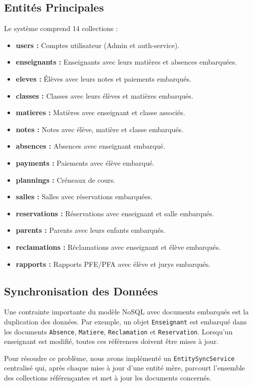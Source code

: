 \documentclass[12pt,a4paper,twoside]{report}
\begin{document}
\subsection{Entités Principales}
Le système comprend 14 collections :
\begin{itemize}[leftmargin=*]
  \item \textbf{users :} Comptes utilisateur (Admin et auth-service).
  \item \textbf{enseignants :} Enseignants avec leurs matières et absences embarquées.
  \item \textbf{eleves :} Élèves avec leurs notes et paiements embarqués.
  \item \textbf{classes :} Classes avec leurs élèves et matières embarqués.
  \item \textbf{matieres :} Matières avec enseignant et classe associés.
  \item \textbf{notes :} Notes avec élève, matière et classe embarqués.
  \item \textbf{absences :} Absences avec enseignant embarqué.
  \item \textbf{payments :} Paiements avec élève embarqué.
  \item \textbf{plannings :} Créneaux de cours.
  \item \textbf{salles :} Salles avec réservations embarquées.
  \item \textbf{reservations :} Réservations avec enseignant et salle embarqués.
  \item \textbf{parents :} Parents avec leurs enfants embarqués.
  \item \textbf{reclamations :} Réclamations avec enseignant et élève embarqués.
  \item \textbf{rapports :} Rapports PFE/PFA avec élève et jurys embarqués.
\end{itemize}

\subsection{Synchronisation des Données}
Une contrainte importante du modèle NoSQL avec documents embarqués est la duplication des données. Par exemple, un objet \texttt{Enseignant} est embarqué dans les documents \texttt{Absence}, \texttt{Matiere}, \texttt{Reclamation} et \texttt{Reservation}. Lorsqu'un enseignant est modifié, toutes ces références doivent être mises à jour.

Pour résoudre ce problème, nous avons implémenté un \texttt{EntitySyncService} centralisé qui, après chaque mise à jour d'une entité mère, parcourt l'ensemble des collections référençantes et met à jour les documents concernés.
\end{document}
